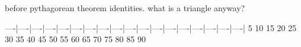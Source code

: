 \begin{myenv}
	before
	pythagorean theorem identities. what is a triangle anyway?
\end{myenv}
----|----|----|----|----|----|----|----|----|----|----|----|----|----|----|----|----|----|
   5   10   15   20   25   30   35   40   45   50   55   60   65   70   75   80   85   90